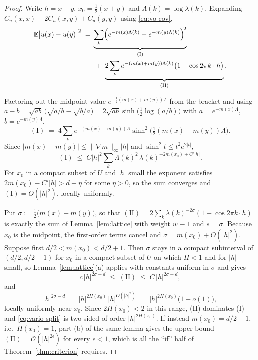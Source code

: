 \documentclass[pdflatex,sn-mathphys,Numbered]{sn-jnl}
\theoremstyle{thmstyleone}%
\theoremstyle{thmstyletwo}%
\theoremstyle{thmstylethree}%
\newcommand{\calO}{\mathcal{O}}
\newcommand{\E}{\mathbb{E}}
\begin{document}
\begin{proof}
Write $h = x-y$, $x_0 = \tfrac12(x+y)$ and $\Lambda(k) = \log\lambda(k)$.
Expanding $C_u(x,x) - 2C_u(x,y) + C_u(y,y)$ using \eqref{eq:vo-cov},
\begin{equation}\label{eq:vario-split}
\begin{split}
    \E\bigl|u(x)-u(y)\bigr|^2
    \;=\;& \underbrace{\sum_{k}\Bigl(e^{-m(x)\Lambda(k)} - e^{-m(y)\Lambda(k)}\Bigr)^{\!2}}_{\mathrm{(I)}} \\
    &\;+\; \underbrace{2\sum_{k} e^{-(m(x)+m(y))\Lambda(k)}\bigl(1-\cos 2\pi k\cdot h\bigr)}_{\mathrm{(II)}} .
\end{split}
\end{equation}

Factoring out the midpoint
value $e^{-\frac12(m(x)+m(y))\Lambda}$ from the bracket and using
$a - b = \sqrt{ab}\,\bigl(\sqrt{a/b}-\sqrt{b/a}\bigr) = 2\sqrt{ab}\sinh\bigl(
\tfrac12\log(a/b)\bigr)$ with $a = e^{-m(x)\Lambda}$, $b = e^{-m(y)\Lambda}$,
\[
    \mathrm{(I)} \;=\; 4\sum_k e^{-(m(x)+m(y))\Lambda}
        \sinh^2\!\bigl(\tfrac12(m(x)-m(y))\Lambda\bigr) .
\]
Since $|m(x)-m(y)| \leq \|\nabla m\|_\infty |h|$ and
$\sinh^2 t \leq t^2 e^{2|t|}$,
\[
    \mathrm{(I)} \;\leq\; C|h|^2 \sum_k \Lambda(k)^2\,
        \lambda(k)^{-2m(x_0) + C'|h|} .
\]
For $x_0$ in a compact subset of $U$ and $|h|$ small the exponent satisfies
$2m(x_0)-C'|h| > d + \eta$ for some $\eta>0$, so the sum converges and
$\mathrm{(I)} = O(|h|^2)$, locally uniformly.

Put
$\sigma := \tfrac12\bigl(m(x)+m(y)\bigr)$, so that
$\mathrm{(II)} = 2\sum_k \lambda(k)^{-2\sigma}(1-\cos2\pi k\cdot h)$ is exactly
the sum of Lemma~\ref{lem:lattice} with weight $w\equiv1$ and $s=\sigma$.
Because $x_0$ is the midpoint, the first-order terms cancel and
$\sigma = m(x_0) + O(|h|^2)$. Suppose first $d/2 < m(x_0) < d/2+1$. Then
$\sigma$ stays in a compact subinterval of $(d/2,d/2+1)$ for $x_0$ in a compact
subset of $U$ on which $H<1$ and for $|h|$ small, so
Lemma~\ref{lem:lattice}(a) applies with constants uniform in $\sigma$ and gives
\[
    c\,|h|^{2\sigma-d} \;\leq\; \mathrm{(II)} \;\leq\; C\,|h|^{2\sigma-d} ,
\]
and
\[
    |h|^{2\sigma-d} \;=\; |h|^{2H(x_0)}\,|h|^{O(|h|^2)}
    \;=\; |h|^{2H(x_0)}\bigl(1+o(1)\bigr) ,
\]
locally uniformly near $x_0$. Since $2H(x_0) < 2$ in this range, \textup{(II)}
dominates \textup{(I)} and \eqref{eq:vario-split} is two-sided of order
$|h|^{2H(x_0)}$. If instead $m(x_0) = d/2+1$, i.e.\ $H(x_0)=1$, part (b) of the
same lemma gives the upper bound $\mathrm{(II)} = \calO(|h|^{2\epsilon})$ for
every $\epsilon<1$, which is all the ``if'' half of
Theorem~\ref{thm:criterion} requires.


\end{proof}
\end{document}
